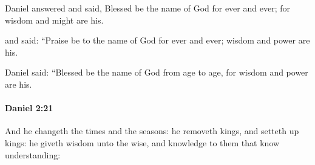 			\begin{versebox}
					\item[BHS] 
					\item[LXX] 
					\item[ASV] Daniel answered and said, Blessed be the name of God for ever and ever; for wisdom and might are his.
					\item[NIV] and said: “Praise be to the name of God for ever and ever; wisdom and power are his.
					\item[NRSV] Daniel said: “Blessed be the name of God from age to age, for wisdom and power are his.
			\end{versebox}

		\paragraph{Daniel 2:21} %
			\label{DANIEL-2-21}

			And he changeth the times and the seasons: he removeth kings, and setteth up kings: he giveth wisdom unto the wise, and knowledge to them that know understanding:

